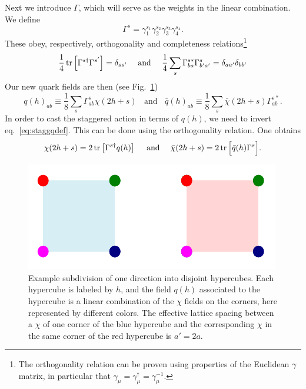 Next we introduce $\Gamma$, which will serve as the weights in the linear
combination. We define
\begin{equation}
  \Gamma^s=\gamma_1^{s_1}\gamma_2^{s_2}\gamma_3^{s_3}\gamma_4^{s_4}.
\end{equation}
These obey, respectively, orthogonality and completeness 
relations\footnote{The orthogonality relation can be proven using
properties of the Euclidean $\gamma$ matrix, in particular that
$\gamma_\mu=\gamma_\mu^\dagger=\gamma_\mu^{-1}$.} 
\begin{equation}
\frac{1}{4}\tr\left[\Gamma^{s\dagger}\Gamma^{s'}\right]=\delta_{ss'}
~~~~\text{and}~~~~
\frac{1}{4}\sum_s\Gamma_{ba}^{s*}\Gamma_{b'a'}^s=\delta_{aa'}\delta_{bb'}
\end{equation}
Our new quark fields are then (see Fig.~\ref{fig:staggHypercubes})
\begin{equation}\label{eq:staggqdef}
  q(h)_{ab}\equiv\frac{1}{8}\sum_s\Gamma^s_{ab}\chi(2h+s)
~~~~\text{and}~~~~
  \bar{q}(h)_{ab}\equiv\frac{1}{8}\sum_s\bar{\chi}(2h+s)\Gamma^{s*}_{ab}.
\end{equation}
In order to cast the staggered action in terms of $q(h)$, we need to
invert eq.~\eqref{eq:staggqdef}. This can be done using the
orthogonality relation. One obtains
\begin{equation}
  \chi(2h+s)=2\tr\left[\Gamma^{s\dagger}q(h)\right]
  ~~~~\text{and}~~~~
  \bar{\chi}(2h+s)=2\tr\Big[\bar{q}(h)\Gamma^s\Big].
\end{equation}

\begin{figure}[t]
  \centering
  \includegraphics{figs/staggHypercubes.pdf}
  \caption{Example subdivision of one direction into disjoint hypercubes.
           Each hypercube is labeled by $h$, and the field $q(h)$
           associated to the hypercube is a linear combination of the
           $\chi$ fields on the corners, here represented by
           different colors. The effective lattice spacing between
           a $\chi$ of one corner of the blue hypercube and the corresponding
           $\chi$ in the same corner of the red hypercube is $a'=2a$.
           }
  \label{fig:staggHypercubes}
\end{figure}

